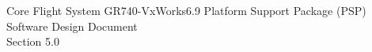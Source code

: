 \documentclass[twoside]{article}
\begin{document}
\hypersetup{pageanchor=false}
\begin{titlepage}
\begin{center}%
\vspace*{7.5cm}
{\Huge Core Flight System GR740-VxWorks6.9 Platform Support Package (PSP)}\\
\vspace*{0.5cm}
{\Huge Software Design Document}\\
\vspace*{0.5cm}
{\Huge Section 5.0}\\
\end{center}
\end{titlepage}
\tableofcontents
{}
\hypersetup{pageanchor=true}

\end{document}
